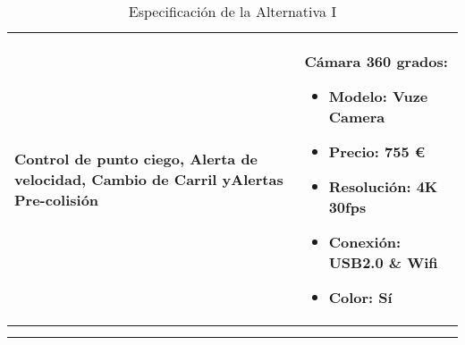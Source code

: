 \begin{center}
\begin{longtable}{p{5cm} p{8cm}}
\\ \hline

\textbf{Control de punto ciego, Alerta de velocidad, Cambio de Carril yAlertas Pre-colisión} &
Cámara 360 grados:
\begin{itemize}
    \item Modelo: Vuze Camera
    \item Precio: 755 \euro
    \item Resolución: 4K 30fps
    \item Conexión: USB2.0 \& Wifi
    \item Color: Sí
\end{itemize}

\\ \hline
\caption{Especificación de la Alternativa I}\\
\label{tab:altI}
\end{longtable}
\end{center}
